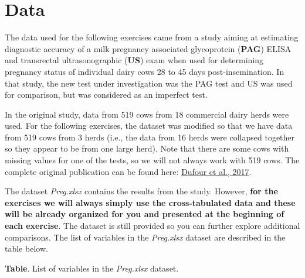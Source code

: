 \documentclass[
]{book}
\begin{document}
\section{Data}\label{data}

The data used for the following exercises came from a study aiming at estimating diagnostic accuracy of a milk pregnancy associated glycoprotein (\textbf{PAG}) ELISA and transrectal ultrasonographic (\textbf{US}) exam when used for determining pregnancy status of individual dairy cows 28 to 45 days post-insemination. In that study, the new test under investigation was the PAG test and US was used for comparison, but was considered as an imperfect test.

In the original study, data from 519 cows from 18 commercial dairy herds were used. For the following exercises, the dataset was modified so that we have data from 519 cows from 3 herds (i.e., the data from 16 herds were collapsed together so they appear to be from one large herd). Note that there are some cows with missing values for one of the tests, so we will not always work with 519 cows. The complete original publication can be found here: \href{https://www.sciencedirect.com/science/article/pii/S016758771630527X?casa_token=jmHY9HiOdEYAAAAA:kGdiIujRzrAQjjFRbGqtUxIBalDGvXllp6ja9w4T2s6c7yPbgc0asnak79bJ5GWWXI8InhCg0sg}{Dufour et al., 2017}.

The dataset \emph{Preg.xlsx} contains the results from the study. However, \textbf{for the exercises we will always simply use the cross-tabulated data and these will be already organized for you and presented at the beginning of each exercise}. The dataset is still provided so you can further explore additional comparisons. The list of variables in the \emph{Preg.xlsx} dataset are described in the table below.

\textbf{Table}. List of variables in the \emph{Preg.xlsx} dataset.
\end{document}
